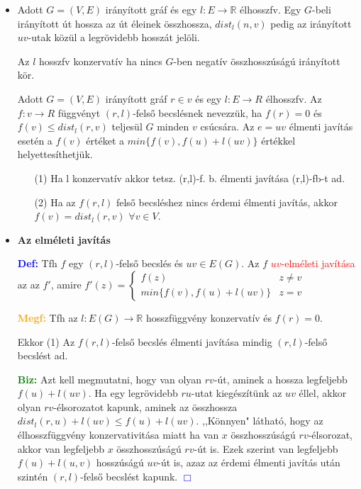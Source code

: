 \documentclass[../../szobeli.tex]{subfiles}
\begin{document}
\begin{itemize}
        \item Adott $G=(V,E)$ irányított gráf és egy $l:E \rightarrow \mathbb{R}$ élhosszfv. 
        Egy $G$-beli irányított út hossza az út éleinek összhossza, $dist_l(n,v)$ pedig az irányított $uv$-utak közül a legrövidebb hosszát jelöli. 

        Az $l$ hosszfv konzervatív ha nincs $G$-ben negatív összhosszúságú irányított kör. 
        
        Adott $G=(V,E)$ irányított gráf $r\in v$ és egy $l:E\rightarrow R$ élhosszfv. Az $f:v \rightarrow R$ függvényt $(r,l)$-felső becslésnek nevezzük, ha $f(r)=0$ és $f(v) \leq dist_l(r,v)$ teljesül $G$ minden $v$ csúcsára. Az $e=uv$ élmenti javítás esetén a $f(v)$ értéket a $min\{f(v),f(u)+l(uv)\}$ értékkel helyettesíthetjük. \begin{itemize}
        \item[(1)] Ha l konzervatív akkor tetsz.  (r,l)-f. b. élmenti javítása (r,l)-fb-t ad.
        \item[(2)] Ha az $f(r,l)$ felső becsléshez nincs érdemi élmenti javítás, akkor $f(v)=dist_l(r,v)$ $\forall v \in V$.
        \end{itemize}
        \item \textbf{Az elméleti javítás}

        \textbf{\textcolor{blue}{Def:}} Tfh $f$ egy $(r,l)$-felső becslés és $uv \in E(G)$. Az $f$ \textcolor{red}{$uv$-elméleti javítása} az az $f'$, amire 
        $
            f'(z) = \begin{cases}
                f(z) & z \neq v \\
                min\{f(v), f(u) + l(uv)\} & z = v
            \end{cases}
        $

        \textbf{\textcolor{orange}{Megf:}} Tfh az $l:E(G)\rightarrow \mathbb{R}$ hosszfüggvény konzervatív és $f(r) = 0$. 
        
        Ekkor (1) Az $f (r,l)$-felső becslés élmenti javítása mindig $(r,l)$-felső becslést ad.

        \textbf{\textcolor{green}{Biz:}} Azt kell megmutatni, hogy van  olyan $rv$-út, aminek a hossza legfeljebb $f(u) + l(uv)$. Ha egy legrövidebb $ru$-utat kiegészítünk az $uv$ éllel, akkor olyan $rv$-élsorozatot kapunk, aminek az összhossza $dist_l (r,u) + l(uv) \leq f(u) + l(uv)$. ,,Könnyen" látható, hogy  az élhosszfüggvény konzervativitása miatt ha van $x$ összhosszúságú $rv$-élsorozat, akkor van legfeljebb $x$ összhosszúságú $rv$-út is. Ezek szerint van legfeljebb $f(u) + l(u,v)$ hosszúságú $uv$-út is, azaz az érdemi élmenti javítás után szintén $(r,l)$-felső becslést kapunk.   \textcolor{blue}{$\Box$} 


\end{itemize}
\end{document}
